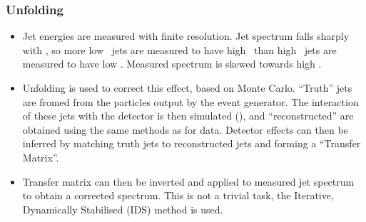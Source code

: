 \documentclass[10pt]{beamer}
\begin{document}
\begin{frame}\frametitle{Unfolding}
\begin{itemize}
\item Jet energies are measured with finite resolution. Jet spectrum falls sharply with \pt, so more low \pt~jets are measured to have high \pt~than high \pt~jets are measured to have low \pt. Measured spectrum is skewed towards high \pt.
\item Unfolding is used to correct this effect, based on Monte Carlo. ``Truth'' jets are fromed from the particles output by the event generator. The interaction of these jets with the detector is then simulated (\geant), and ``reconstructed'' are obtained using the same methods as for data. Detector effects can then be inferred by matching truth jets to reconstructed jets and forming a ``Transfer Matrix''.
\item Transfer matrix can then be inverted and applied to measured jet spectrum to obtain a corrected spectrum. This is not a trivial task, the Iterative, Dynamically Stabilised (IDS) method is used.
\end{itemize}
\end{frame}
\end{document}
